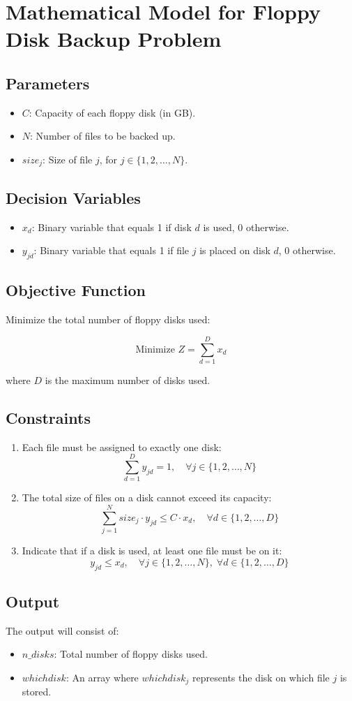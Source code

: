 \documentclass{article}
\begin{document}
\section*{Mathematical Model for Floppy Disk Backup Problem}

\subsection*{Parameters}
\begin{itemize}
    \item $C$: Capacity of each floppy disk (in GB).
    \item $N$: Number of files to be backed up.
    \item $size_j$: Size of file $j$, for $j \in \{1, 2, \ldots, N\}$.
\end{itemize}

\subsection*{Decision Variables}
\begin{itemize}
    \item $x_{d}$: Binary variable that equals 1 if disk $d$ is used, 0 otherwise.
    \item $y_{jd}$: Binary variable that equals 1 if file $j$ is placed on disk $d$, 0 otherwise.
\end{itemize}

\subsection*{Objective Function}
Minimize the total number of floppy disks used:

\[
\text{Minimize } Z = \sum_{d=1}^{D} x_d
\]

where $D$ is the maximum number of disks used.

\subsection*{Constraints}
\begin{enumerate}
    \item Each file must be assigned to exactly one disk:
    \[
    \sum_{d=1}^{D} y_{jd} = 1, \quad \forall j \in \{1, 2, \ldots, N\}
    \]

    \item The total size of files on a disk cannot exceed its capacity:
    \[
    \sum_{j=1}^{N} size_j \cdot y_{jd} \leq C \cdot x_d, \quad \forall d \in \{1, 2, \ldots, D\}
    \]

    \item Indicate that if a disk is used, at least one file must be on it:
    \[
    y_{jd} \leq x_d, \quad \forall j \in \{1, 2, \ldots, N\}, \; \forall d \in \{1, 2, \ldots, D\}
    \]

\end{enumerate}

\subsection*{Output}
The output will consist of:
\begin{itemize}
    \item $n\_disks$: Total number of floppy disks used.
    \item $whichdisk$: An array where $whichdisk_j$ represents the disk on which file $j$ is stored.
\end{itemize}
\end{document}
